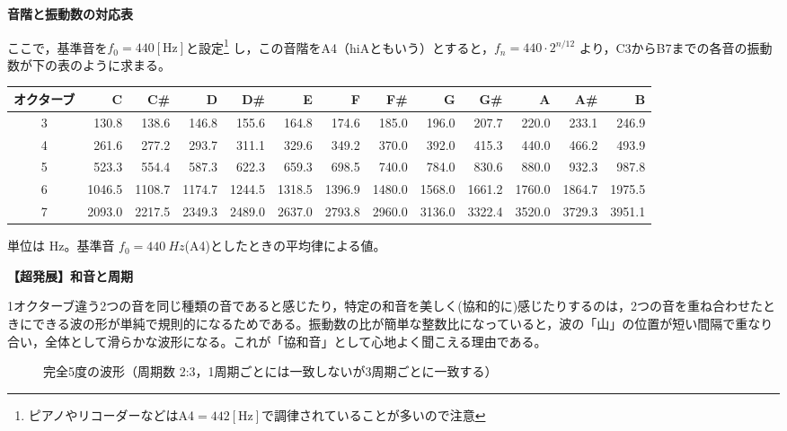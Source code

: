 \documentclass[a4paper,11pt]{ltjsarticle}
\newcommand{\subbanner}[1]{%
  \begin{tcolorbox}[colback=black!85,coltext=white,boxrule=0pt,sharp corners,
    left=6pt,right=6pt,top=3pt,bottom=3pt,before skip=6pt,after skip=5pt]
    {\bfseries #1}
  \end{tcolorbox}}
\begin{document}
\subbanner{音階と振動数の対応表}
ここで，基準音を$f_0=440[\mathrm{Hz}]$と設定\footnote{ピアノやリコーダーなどはA4$=442[\mathrm{Hz}]$で調律されていることが多いので注意}
し，この音階をA4（hiAともいう）とすると，$\boxed{f_n=440\cdot 2^{n/12}}$ より，C3からB7までの各音の振動数が下の表のように求まる。
\begin{center}
{\footnotesize
\begin{tabular}{@{}c*{12}{r}@{}}
\toprule
\textbf{オクターブ} & C & C\# & D & D\# & E & F & F\# & G & G\# & A & A\# & B \\
\midrule
3 & 130.8 & 138.6 & 146.8 & 155.6 & 164.8 & 174.6 & 185.0 & 196.0 & 207.7 & 220.0 & 233.1 & 246.9 \\
4 & 261.6 & 277.2 & 293.7 & 311.1 & 329.6 & 349.2 & 370.0 & 392.0 & 415.3 & 440.0 & 466.2 & 493.9 \\
5 & 523.3 & 554.4 & 587.3 & 622.3 & 659.3 & 698.5 & 740.0 & 784.0 & 830.6 & 880.0 & 932.3 & 987.8 \\
6 & 1046.5 & 1108.7 & 1174.7 & 1244.5 & 1318.5 & 1396.9 & 1480.0 & 1568.0 & 1661.2 & 1760.0 & 1864.7 & 1975.5 \\
7 & 2093.0 & 2217.5 & 2349.3 & 2489.0 & 2637.0 & 2793.8 & 2960.0 & 3136.0 & 3322.4 & 3520.0 & 3729.3 & 3951.1 \\
\bottomrule
\end{tabular}
}
\end{center}
\begin{center}
{\footnotesize 単位は $\mathrm{Hz}$。基準音 $f_0=\SI{440}{Hz}$(A4)としたときの平均律による値。}
\end{center}

\clearpage
\subbanner{【超発展】和音と周期}
1オクターブ違う2つの音を同じ種類の音であると感じたり，特定の和音を美しく(協和的に)感じたりするのは，2つの音を重ね合わせたときにできる波の形が単純で規則的になるためである。振動数の比が簡単な整数比になっていると，波の「山」の位置が短い間隔で重なり合い，全体として滑らかな波形になる。これが「協和音」として心地よく聞こえる理由である。

\begin{figure}[htbp]
\centering
{}
\caption{完全5度の波形（周期数 2:3，1周期ごとには一致しないが3周期ごとに一致する）}
\end{figure}
\end{document}
